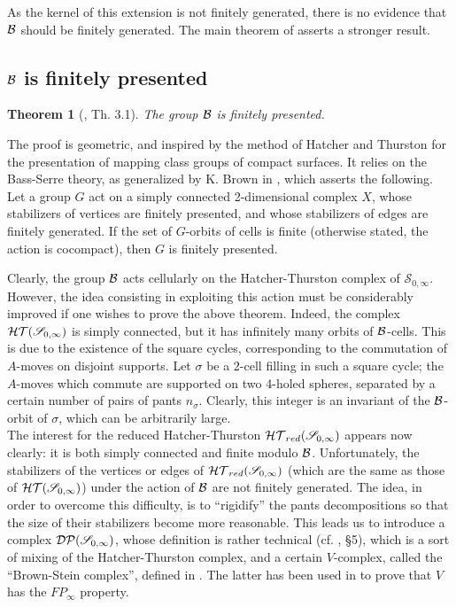 \documentclass[twoside]{irmaems}
\theoremstyle{plain}
\newtheorem{theorem}{Theorem}[section]
\theoremstyle{definition}
\theoremstyle{remark}
\newcommand{\B}{{{\cal B}}}
\begin{document}
\vspace{0.1cm}\noindent 
As the kernel of this extension is not finitely generated, there is no evidence that ${\cal B}$ should be finitely generated. 
The main theorem of \cite{fu-ka1} asserts a stronger result.


\subsection{$\B$ is finitely presented}

\begin{theorem}[\cite{fu-ka1}, Th. 3.1]
The group $\B$ is finitely presented.
\end{theorem}

\vspace{0.1cm}\noindent 
The proof is geometric, and inspired by the method of  Hatcher and Thurston for the presentation 
of mapping class groups of compact surfaces. It relies on the Bass-Serre theory, as generalized by K. Brown in 
\cite{br1}, which asserts the following. Let a group $G$ act on a simply connected 2-dimensional complex $X$, whose stabilizers of vertices are finitely presented, 
and whose stabilizers of edges are finitely generated. If the set of $G$-orbits of cells is finite (otherwise stated, the action is cocompact), then $G$ is finitely presented. 

\vspace{0.1cm}\noindent 
Clearly, the group ${\cal B}$ acts cellularly on the Hatcher-Thurston complex of  $\mathscr{S}_{0,\infty}$. However, the idea consisting in 
exploiting this action must be considerably improved if one wishes to prove the above theorem. Indeed, the complex ${\cal HT}(\mathscr{S}_{0,\infty})$ is simply connected, but it has infinitely many orbits of $\B$-cells. 
This is due to the existence of the square cycles, corresponding to the commutation of $A$-moves 
on disjoint supports. Let $\sigma$ be a 2-cell filling in such a square cycle; the $A$-moves which commute are supported on two 4-holed spheres, separated by a certain number of pairs of pants $n_{\sigma}$. Clearly, this integer is an invariant of the $\B$-orbit of $\sigma$, which can be arbitrarily large.\\
The interest for the reduced Hatcher-Thurston  ${\cal HT}_{red}(\mathscr{S}_{0,\infty})$ appears now clearly: it is both simply connected and finite modulo $\B$. 
Unfortunately, the stabilizers of the vertices or edges of ${\cal HT}_{red}(\mathscr{S}_{0,\infty})$ (which are the same as those of ${\cal HT}(\mathscr{S}_{0,\infty})$) 
under the action of ${\cal B}$ are not finitely generated. The idea, in order to overcome this difficulty, is to ``rigidify'' 
the pants decompositions so that the size of their stabilizers become more reasonable.
This leads us to introduce a complex ${\cal DP}(\mathscr{S}_{0,\infty})$, whose definition is rather technical (cf. \cite{fu-ka1}, \S5), 
which is a sort of mixing of the Hatcher-Thurston complex, and a certain $V$-complex, called the ``Brown-Stein complex'',  defined in \cite{br2}. 
The latter has been used in \cite{br2} to prove that $V$ has the $FP_{\infty}$ property.
\end{document}
